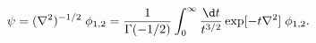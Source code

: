 \begin{equation}
\psi = (\nabla^2)^{-1/2} \; \phi_{1,2} = 
{1\over\Gamma(-1/2)} \int_0^\infty {\d t\over t^{3/2}} 
\exp[-t \nabla^2] \; \phi_{1,2}.
\end{equation}

